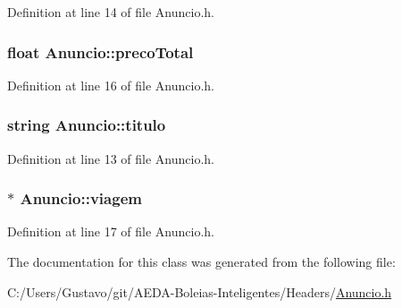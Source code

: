 Definition at line 14 of file Anuncio.\+h.

\hypertarget{class_anuncio_a8ba7cc797b8b582c596038a17e9bce3b}{
\subsubsection[{preco\+Total}]{\setlength{\rightskip}{0pt plus 5cm}float Anuncio\+::preco\+Total\hspace{0.3cm}{\ttfamily [private]}}}\label{class_anuncio_a8ba7cc797b8b582c596038a17e9bce3b}


Definition at line 16 of file Anuncio.\+h.

\hypertarget{class_anuncio_adb34bedd8220f42b9ee37662c21313e6}{
\subsubsection[{titulo}]{\setlength{\rightskip}{0pt plus 5cm}string Anuncio\+::titulo\hspace{0.3cm}{\ttfamily [private]}}}\label{class_anuncio_adb34bedd8220f42b9ee37662c21313e6}


Definition at line 13 of file Anuncio.\+h.

\hypertarget{class_anuncio_aa225374a19420f56f5abc258d96b691a}{
\subsubsection[{viagem}]{$\ast$ Anuncio\+::viagem\hspace{0.3cm}{\ttfamily [private]}}}\label{class_anuncio_aa225374a19420f56f5abc258d96b691a}


Definition at line 17 of file Anuncio.\+h.



The documentation for this class was generated from the following file\+:\begin{DoxyCompactItemize}
\item 
C\+:/\+Users/\+Gustavo/git/\+A\+E\+D\+A-\/\+Boleias-\/\+Inteligentes/\+Headers/\hyperlink{_anuncio_8h}{Anuncio.\+h}\end{DoxyCompactItemize}
